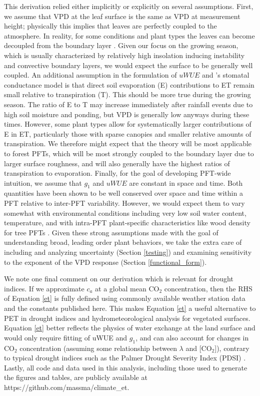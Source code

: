\documentclass[draft,linenumbers]{afmjournal}
\begin{document}
This derivation relied either implicitly or explicitly on several
assumptions. First, we assume that VPD at the leaf surface is the same
as VPD at measurement height; physically this implies that leaves are
perfectly coupled to the atmosphere. In reality, for some conditions
and plant types the leaves can become decoupled from the boundary
layer \citep{De_2017, Medlyn_2017}. Given our focus on the growing
season, which is usually characterized by relatively high insolation
inducing instability and convective boundary layers, we would expect
the surface to be generally well coupled. An additional assumption in
the formulation of $uWUE$ \citep{Zhou_2014, Zhou_2015} and
\citet{Medlyn_2017}'s stomatal conductance model is that direct soil
evaporation (E) contributions to ET remain small relative to
transpiration (T). This should be more true during the growing
season. The ratio of E to T may increase immediately after rainfall
events due to high soil moisture and ponding, but VPD is generally low
anyways during these times. However, some plant types allow for
systematically larger contributions of E in ET, particularly those
with sparse canopies and smaller relative amounts of transpiration. We
therefore might expect that the theory will be most applicable to
forest PFTs, which will be most strongly coupled to the boundary layer
due to larger surface roughness, and will also generally have the
highest ratios of transpiration to evaporation. Finally, for the goal
of developing PFT-wide intuition, we assume that $g_1$ and $uWUE$ are
constant in space and time. Both quantities have been shown to be well
conserved over space and time within a PFT relative to inter-PFT
variability. However, we would expect them to vary somewhat with
environmental conditions including very low soil water content,
temperature, and with intra-PFT plant-specific characteristics like
wood density for tree PFTs \citep{Lin_2015}. Given these strong
assumptions made with the goal of understanding broad, leading order
plant behaviors, we take the extra care of including and analyzing
uncertainty (Section \ref{testing}) and examining sensitivity to the
exponent of the VPD response (Section \ref{functional_form}).

We note one final comment on our derivation which is relevant for
drought indices. If we approximate $c_a$ at a global mean CO$_2$
concentration, then the RHS of Equation \ref{et} is fully defined
using commonly available weather station data and the constants
published here. This makes Equation \ref{et} a useful alternative to
PET in drought indices and hydrometeorological analysis for vegetated
surfaces. Equation \ref{et} better reflects the physics of water
exchange at the land surface and would only require fitting of uWUE
and $g_1$, and can also account for changes in CO$_2$ concentration
(assuming some relationship between $\lambda$ and [CO$_2$]), contrary
to typical drought indices such as the Palmer Drought Severity Index
(PDSI) \citep{Swann_2016, Lemordant_2016, Lemordant_2018}. Lastly, all
code and data used in this analysis, including those used to generate
the figures and tables, are publicly available at
https://github.com/massma/climate\_et.
\end{document}
